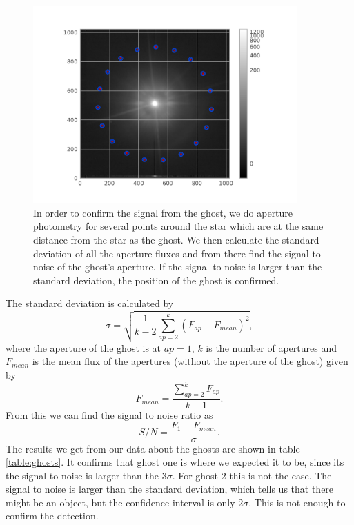 \begin{figure}[H]
	\centering
		\includegraphics[width=0.9\textwidth]{pics/aperture_photometry_19_ghost1.pdf}
		\caption{In order to confirm the signal from the ghost, we do aperture photometry for several points around the star which are at the same distance from the star as the ghost. We then calculate the standard deviation of all the aperture fluxes and from there find the signal to noise of the ghost's aperture. If the signal to noise is larger than the standard deviation, the position of the ghost is confirmed.}
		\label{fig:ap_phot_gh1}
\end{figure}
The standard deviation is calculated by
\begin{equation}
	\sigma = \sqrt{\frac{1}{k-2} \sum_{ap=2}^{k} (F_{ap} - F_{mean})^2} ,
\end{equation}
where the aperture of the ghost is at $ap=1$, $k$ is the number of apertures and $F_{mean}$ is the mean flux of the apertures (without the aperture of the ghost) given by
\begin{equation}
	F_{mean} = \frac{\sum_{ap=2}^{k} F_{ap}}{k-1} .
\end{equation}
From this we can find the signal to noise ratio as
\begin{equation}
	S/N = \frac{F_1 - F_{mean}}{\sigma} .
\end{equation}
The results we get from our data about the ghosts are shown in table \ref{table:ghosts}. It confirms that ghost one is where we expected it to be, since its the signal to noise is larger than the $3 \sigma$. For ghost 2 this is not the case. The signal to noise is larger than the standard deviation, which tells us that there might be an object, but the confidence interval is only $2 \sigma$. This is not enough to confirm the detection. \\
